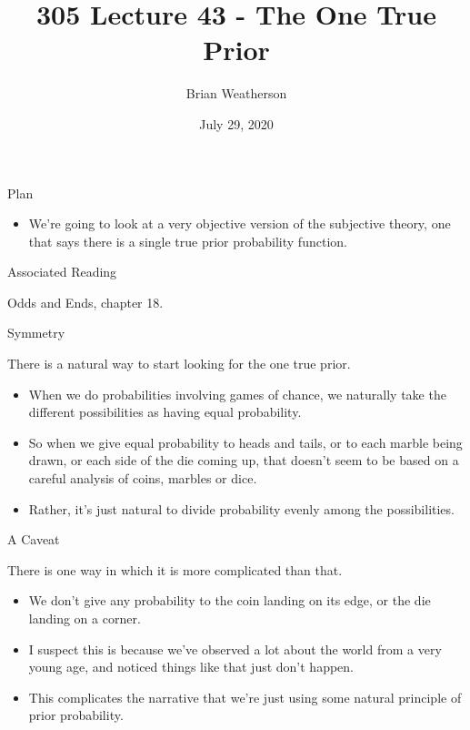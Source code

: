 \documentclass[
  ignorenonframetext,
]{beamer}
\title{305 Lecture 43 - The One True Prior}
\author{Brian Weatherson}
\date{July 29, 2020}
\providecommand{\tightlist}{%
  \setlength{\itemsep}{0pt}\setlength{\parskip}{0pt}}
\renewcommand{\,}{\text{, }}
\begin{document}
\frame{\titlepage}

\begin{frame}{Plan}
\protect\hypertarget{plan}{}

\begin{itemize}
\tightlist
\item
  We're going to look at a very objective version of the subjective
  theory, one that says there is a single true prior probability
  function.
\end{itemize}

\end{frame}

\begin{frame}{Associated Reading}
\protect\hypertarget{associated-reading}{}

Odds and Ends, chapter 18.

\end{frame}

\begin{frame}{Symmetry}
\protect\hypertarget{symmetry}{}

There is a natural way to start looking for the one true prior.

\begin{itemize}
\tightlist
\item
  When we do probabilities involving games of chance, we naturally take
  the different possibilities as having equal probability.
\item
  So when we give equal probability to heads and tails, or to each
  marble being drawn, or each side of the die coming up, that doesn't
  seem to be based on a careful analysis of coins, marbles or dice.
\item
  Rather, it's just natural to divide probability evenly among the
  possibilities.
\end{itemize}

\end{frame}

\begin{frame}{A Caveat}
\protect\hypertarget{a-caveat}{}

There is one way in which it is more complicated than that.

\begin{itemize}
\tightlist
\item
  We don't give any probability to the coin landing on its edge, or the
  die landing on a corner.
\item
  I suspect this is because we've observed a lot about the world from a
  very young age, and noticed things like that just don't happen.
\item
  This complicates the narrative that we're just using some natural
  principle of prior probability.
\end{itemize}

\end{frame}
\end{document}
